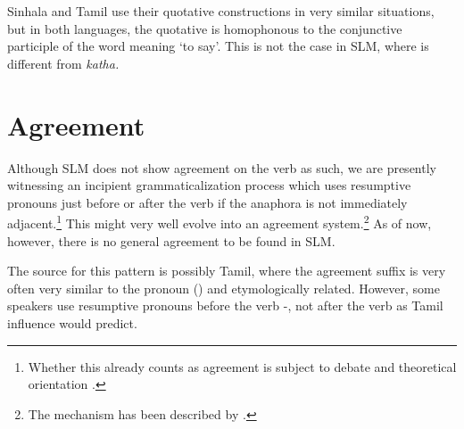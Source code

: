  





Sinhala and Tamil use their quotative constructions in very similar situations, but in both languages, the quotative is homophonous to the conjunctive participle of the word meaning `to say'. This is not the case in SLM, where  is different from \em katha\em.









\section{Agreement}\label{sec:cls:Agreement}
Although SLM does not show agreement on the verb as such, we are presently witnessing an incipient grammaticalization process which uses resumptive pronouns just before or after the verb if the anaphora is not immediately adjacent.\footnote{Whether this already counts as agreement is subject to debate and theoretical orientation \citep[cf.][99f.]{Corbett2006}.}
This might very well evolve into an agreement system.\footnote{The mechanism has been described by \citet{Givon1976tpga}.} As of now, however, there is no general agreement to be found in SLM.




The source for this pattern is possibly Tamil, where the agreement suffix is very often very similar to the pronoun () and etymologically related. However, some speakers use resumptive pronouns before the verb -, not after the verb as Tamil influence would predict.


